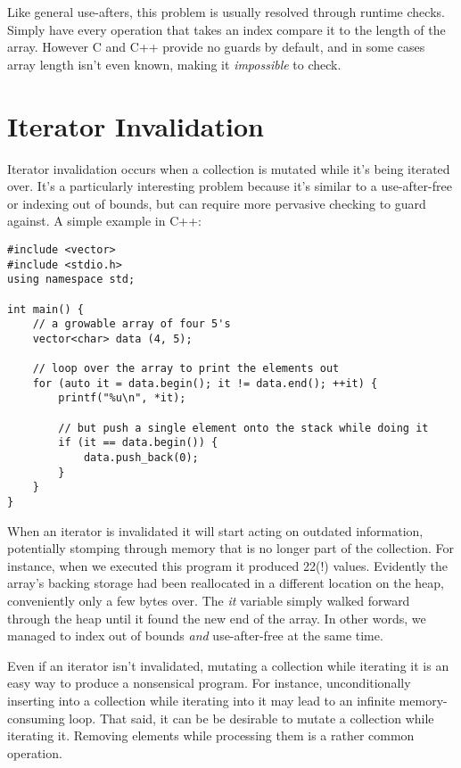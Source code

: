 Like general use-afters, this problem is usually resolved through runtime
checks. Simply have every operation that takes an index compare it to the length of the
array. However C and C++ provide no guards by default, and in some cases array
length isn't even known, making it \emph{impossible} to check.





\section{Iterator Invalidation}

Iterator invalidation occurs when a collection is mutated while it's being iterated
over. It's a particularly interesting problem because it's similar to a
use-after-free or indexing out of bounds, but can require more pervasive checking
to guard against. A simple example in C++:

\begin{verbatim}
#include <vector>
#include <stdio.h>
using namespace std;

int main() {
    // a growable array of four 5's
    vector<char> data (4, 5);

    // loop over the array to print the elements out
    for (auto it = data.begin(); it != data.end(); ++it) {
        printf("%u\n", *it);

        // but push a single element onto the stack while doing it
        if (it == data.begin()) {
            data.push_back(0);
        }
    }
}
\end{verbatim}

When an iterator is invalidated it will start acting on
outdated information, potentially stomping through memory that is no longer
part of the collection. For instance, when we executed this program it produced
22(!) values. Evidently the array's backing storage had been reallocated
in a different location on the heap, conveniently only a few bytes over. The \emph{it}
variable simply walked forward through the heap until it found the new end of
the array. In other words, we managed to index out of bounds \emph{and} use-after-free
at the same time.

Even if an iterator isn't invalidated, mutating a collection
while iterating it is an easy way to produce a nonsensical program. For instance,
unconditionally inserting into a collection while iterating into it may lead
to an infinite memory-consuming loop. That said, it can be be desirable to
mutate a collection while iterating it. Removing elements while processing them
is a rather common operation.

